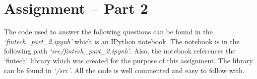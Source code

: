 
\chapter{Assignment – Part 2}\label{chp:pt2}
The code used to answer the following questions can be found in the \textit{‘fintech\_part\_2.ipynb’} which is an IPython notebook.  The notebook is in the following path \textit{‘src/fintech\_part\_2.ipynb’}. Also, the notebook references the ‘fintech’ library which was created for the purpose of this assignment. The library can be found in \textit{‘/src’}. All the code is well commented and easy to follow with. 







